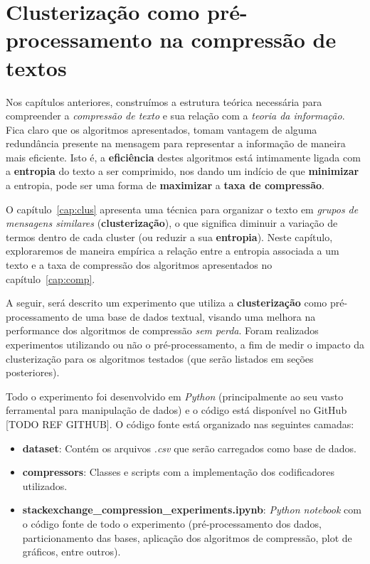 
\chapter{Clusterização como pré-processamento na compressão de textos}
Nos capítulos anteriores, construímos a estrutura teórica necessária para compreender a \emph{compressão de texto} e sua relação com a \emph{teoria da informação}.
Fica claro que os algoritmos apresentados, tomam vantagem de alguma redundância presente na mensagem para representar a informação de maneira mais eficiente.
Isto é, a \textbf{eficiência} destes algoritmos está intimamente ligada com a \textbf{entropia} do texto a ser comprimido,
 nos dando um indício de que \textbf{minimizar} a entropia, pode ser uma forma de \textbf{maximizar} a \textbf{taxa de compressão}.
 
O capítulo~\ref{cap:clus} apresenta uma técnica para organizar o texto em \emph{grupos de mensagens similares} (\textbf{clusterização}), o que significa diminuir a variação de termos dentro de cada cluster (ou reduzir a sua \textbf{entropia}).
Neste capítulo, exploraremos de maneira empírica a relação entre a entropia associada a um texto e a taxa de compressão dos algoritmos apresentados no capítulo~\ref{cap:comp}.

A seguir, será descrito um experimento que utiliza a \textbf{clusterização} como pré-processamento de uma base de dados textual, visando uma melhora na performance dos algoritmos de compressão \emph{sem perda}.
Foram realizados experimentos utilizando ou não o pré-processamento, a fim de medir o impacto da clusterização para os algoritmos testados (que serão listados em seções posteriores).

Todo o experimento foi desenvolvido em \emph{Python} (principalmente ao seu vasto ferramental para manipulação de dados) e o código está disponível no GitHub [TODO REF GITHUB].
O código fonte está organizado nas seguintes camadas:
\begin{itemize}
	\item \textbf{dataset}: Contém os arquivos \emph{.csv} que serão carregados como base de dados.
	\item \textbf{compressors}: Classes e scripts com a implementação dos codificadores utilizados.
	\item \textbf{stackexchange\_compression\_experiments.ipynb}: \emph{Python notebook} com o código fonte de todo o experimento (pré-processamento dos dados, particionamento das bases, aplicação dos algoritmos de compressão, plot de gráficos, entre outros).
\end{itemize}
\pagebreak

